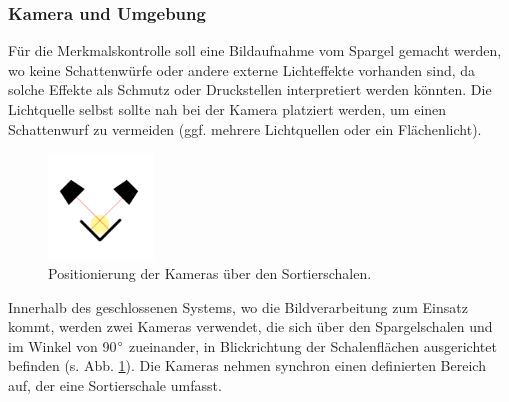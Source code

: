 \documentclass{ezb}
\begin{document}
\subsubsection*{Kamera und Umgebung}
Für die Merkmalskontrolle soll eine Bildaufnahme vom Spargel gemacht werden, wo keine Schattenwürfe oder andere externe Lichteffekte vorhanden sind, da solche Effekte als Schmutz oder Druckstellen interpretiert werden könnten. Die Lichtquelle selbst sollte nah bei der Kamera platziert werden, um einen Schattenwurf zu vermeiden (ggf. mehrere Lichtquellen oder ein Flächenlicht).\\
\begin{figure}
\includegraphics[width=0.25\textwidth]{kameras.png}
\caption{\label{fig:kameras}Positionierung der Kameras über den Sortierschalen.}
\end{figure}
Innerhalb des geschlossenen Systems, wo die Bildverarbeitung zum Einsatz kommt, werden zwei Kameras verwendet, die sich über den Spargelschalen und im Winkel von 90$\degree$ zueinander, in Blickrichtung der Schalenflächen ausgerichtet befinden (s. Abb. \ref{fig:kameras}). Die Kameras nehmen synchron einen definierten Bereich auf, der eine Sortierschale umfasst.
\clearpage
\end{document}
